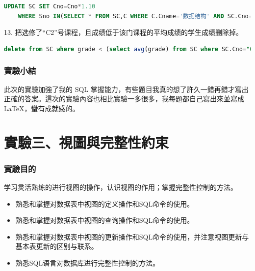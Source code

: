 \documentclass[12pt, a4paper]{report}
\begin{document}
\begin{lstlisting}[language=SQL]
    UPDATE SC SET Cno=Cno*1.10 
    WHERE Sno IN(SELECT * FROM SC,C WHERE C.Cname='数据结构' AND SC.Cno=C.Cno);
\end{lstlisting}

13. 把选修了“C2”号课程，且成绩低于该门课程的平均成绩的学生成绩删除掉。\\

\begin{lstlisting}[language=SQL]
    delete from SC where grade < (select avg(grade) from SC where SC.Cno="C2");
\end{lstlisting}

\begin{figure}[H] %
    \centering %
\end{figure}

\section{實驗小結}

此次的實驗加強了我的 SQL 掌握能力，有些題目我真的想了許久一錯再錯才寫出正確的答案。這次的實驗內容也相比實驗一多很多，我每題都自己寫出來並寫成 LaTeX，蠻有成就感的。

\part{實驗三、視圖與完整性約束}

\section{實驗目的}

学习灵活熟练的进行视图的操作，认识视图的作用；掌握完整性控制的方法。

\begin{itemize}
    \item 熟悉和掌握对数据表中视图的定义操作和SQL命令的使用。
    \item 熟悉和掌握对数据表中视图的查询操作和SQL命令的使用。
    \item 熟悉和掌握对数据表中视图的更新操作和SQL命令的使用，并注意视图更新与基本表更新的区别与联系。
    \item 熟悉SQL语言对数据库进行完整性控制的方法。
\end{itemize}
\end{document}
